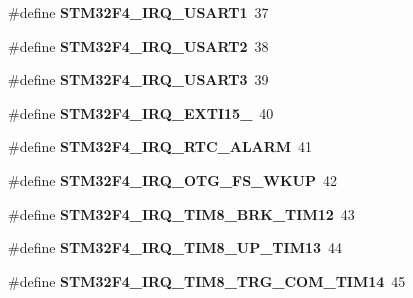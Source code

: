 \begin{DoxyCompactItemize}
\item 
\mbox{\label{group__stm32f4__interrupt_ga168d04c4c5d9b5eceaf48d3cfe9c0080}} 
\#define {\bfseries S\+T\+M32\+F4\+\_\+\+I\+R\+Q\+\_\+\+U\+S\+A\+R\+T1}~37
\item 
\mbox{\label{group__stm32f4__interrupt_ga65eb4ae3de2f01ea0bda57aa80c175ef}} 
\#define {\bfseries S\+T\+M32\+F4\+\_\+\+I\+R\+Q\+\_\+\+U\+S\+A\+R\+T2}~38
\item 
\mbox{\label{group__stm32f4__interrupt_gadbc363d1c0da1ceac14a01d964834c80}} 
\#define {\bfseries S\+T\+M32\+F4\+\_\+\+I\+R\+Q\+\_\+\+U\+S\+A\+R\+T3}~39
\item 
\mbox{\label{group__stm32f4__interrupt_ga8d3c0b537a633f8922f974ad02208fb1}} 
\#define {\bfseries S\+T\+M32\+F4\+\_\+\+I\+R\+Q\+\_\+\+E\+X\+T\+I15\+\_}~40
\item 
\mbox{\label{group__stm32f4__interrupt_gafb7d88d24e1ad10124d6f6c569c4a246}} 
\#define {\bfseries S\+T\+M32\+F4\+\_\+\+I\+R\+Q\+\_\+\+R\+T\+C\+\_\+\+A\+L\+A\+RM}~41
\item 
\mbox{\label{group__stm32f4__interrupt_gae46c6bf0945970f6055c0357d388ad21}} 
\#define {\bfseries S\+T\+M32\+F4\+\_\+\+I\+R\+Q\+\_\+\+O\+T\+G\+\_\+\+F\+S\+\_\+\+W\+K\+UP}~42
\item 
\mbox{\label{group__stm32f4__interrupt_ga62a49393c91e800a511b7588c6e4a0ad}} 
\#define {\bfseries S\+T\+M32\+F4\+\_\+\+I\+R\+Q\+\_\+\+T\+I\+M8\+\_\+\+B\+R\+K\+\_\+\+T\+I\+M12}~43
\item 
\mbox{\label{group__stm32f4__interrupt_ga38209512e1c76a34949c7fc6b06cfdca}} 
\#define {\bfseries S\+T\+M32\+F4\+\_\+\+I\+R\+Q\+\_\+\+T\+I\+M8\+\_\+\+U\+P\+\_\+\+T\+I\+M13}~44
\item 
\mbox{\label{group__stm32f4__interrupt_ga70f700f1052f9b4e8871d9fd6c4f772a}} 
\#define {\bfseries S\+T\+M32\+F4\+\_\+\+I\+R\+Q\+\_\+\+T\+I\+M8\+\_\+\+T\+R\+G\+\_\+\+C\+O\+M\+\_\+\+T\+I\+M14}~45
\item 

\end{DoxyCompactItemize}
